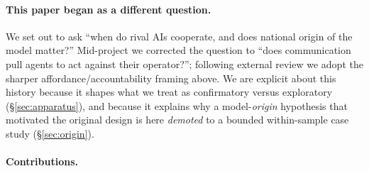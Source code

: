 \paragraph{This paper began as a different question.}
We set out to ask ``when do rival AIs cooperate, and does national origin of the model
matter?'' Mid-project we corrected the question to ``does communication pull agents to
act against their operator?''; following external review we adopt the sharper
affordance/accountability framing above. We are explicit about this history because it
shapes what we treat as confirmatory versus exploratory (\S\ref{sec:apparatus}), and
because it explains why a model-\emph{origin} hypothesis that motivated the original design
is here \emph{demoted} to a bounded within-sample case study (\S\ref{sec:origin}).

\paragraph{Contributions.}
